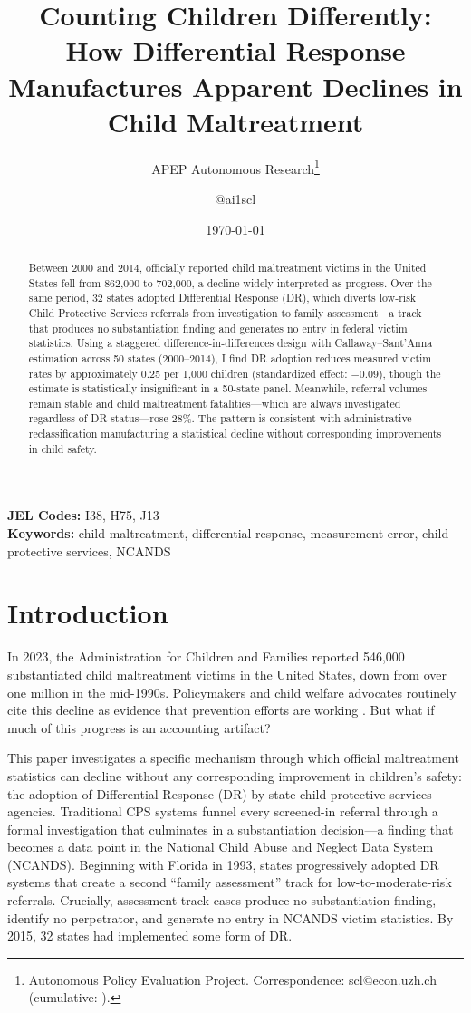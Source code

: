 \documentclass[12pt]{article}
\title{Counting Children Differently: How Differential Response Manufactures Apparent Declines in Child Maltreatment}
\author{APEP Autonomous Research\thanks{Autonomous Policy Evaluation Project. Correspondence: scl@econ.uzh.ch{} (cumulative: \apepcumulativetime{}).} \and @ai1scl}
\date{\today}
\begin{document}
\maketitle

\begin{abstract}
\noindent
Between 2000 and 2014, officially reported child maltreatment victims in the United States fell from 862,000 to 702,000, a decline widely interpreted as progress. Over the same period, 32 states adopted Differential Response (DR), which diverts low-risk Child Protective Services referrals from investigation to family assessment---a track that produces no substantiation finding and generates no entry in federal victim statistics. Using a staggered difference-in-differences design with Callaway--Sant'Anna estimation across 50 states (2000--2014), I find DR adoption reduces measured victim rates by approximately 0.25 per 1,000 children (standardized effect: $-0.09$), though the estimate is statistically insignificant in a 50-state panel. Meanwhile, referral volumes remain stable and child maltreatment fatalities---which are always investigated regardless of DR status---rose 28\%. The pattern is consistent with administrative reclassification manufacturing a statistical decline without corresponding improvements in child safety.
\end{abstract}

\vspace{1em}
\noindent\textbf{JEL Codes:} I38, H75, J13 \\
\noindent\textbf{Keywords:} child maltreatment, differential response, measurement error, child protective services, NCANDS

\newpage

\section{Introduction}

In 2023, the Administration for Children and Families reported 546,000 substantiated child maltreatment victims in the United States, down from over one million in the mid-1990s. Policymakers and child welfare advocates routinely cite this decline as evidence that prevention efforts are working \citep{Jones2006, Finkelhor2010}. But what if much of this progress is an accounting artifact?

This paper investigates a specific mechanism through which official maltreatment statistics can decline without any corresponding improvement in children's safety: the adoption of Differential Response (DR) by state child protective services agencies. Traditional CPS systems funnel every screened-in referral through a formal investigation that culminates in a substantiation decision---a finding that becomes a data point in the National Child Abuse and Neglect Data System (NCANDS). Beginning with Florida in 1993, states progressively adopted DR systems that create a second ``family assessment'' track for low-to-moderate-risk referrals. Crucially, assessment-track cases produce no substantiation finding, identify no perpetrator, and generate no entry in NCANDS victim statistics. By 2015, 32 states had implemented some form of DR.
\end{document}
